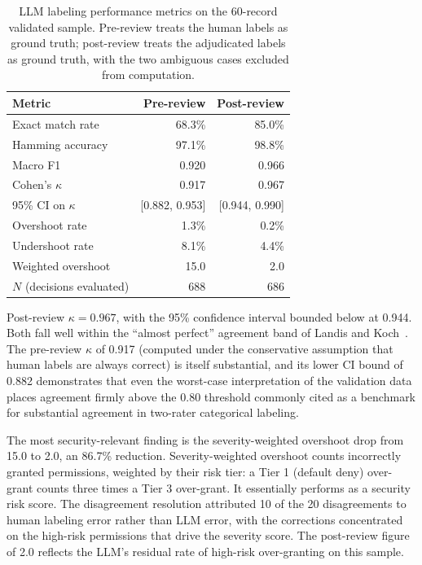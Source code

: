 \documentclass{article}
\theoremstyle{plain}
\theoremstyle{definition}
\theoremstyle{remark}
\begin{document}
\begin{table}[htbp]
\centering
\begin{tabular}{lrr}
\toprule
\textbf{Metric} & \textbf{Pre-review} & \textbf{Post-review} \\
\midrule
Exact match rate & 68.3\% & 85.0\% \\
Hamming accuracy & 97.1\% & 98.8\% \\
Macro F1 & 0.920 & 0.966 \\
Cohen's $\kappa$ & 0.917 & 0.967 \\
95\% CI on $\kappa$ & [0.882, 0.953] & [0.944, 0.990] \\
Overshoot rate & 1.3\% & 0.2\% \\
Undershoot rate & 8.1\% & 4.4\% \\
Weighted overshoot & 15.0 & 2.0 \\
$N$ (decisions evaluated) & 688 & 686 \\
\bottomrule
\end{tabular}
\caption{LLM labeling performance metrics on the 60-record validated 
sample. Pre-review treats the human labels as ground truth; 
post-review treats the adjudicated labels as ground truth, with the 
two ambiguous cases excluded from computation.}
\label{tab:pre-post-metrics}
\end{table}

Post-review $\kappa = 0.967$, with the 95\% 
confidence interval bounded below at 0.944. Both fall well within the 
``almost perfect'' agreement band of Landis and 
Koch~\citep{landis1977measurement}. The pre-review $\kappa$ of 0.917 
(computed under the conservative assumption that human labels are 
always correct) is itself substantial, and its lower CI bound of 0.882 
demonstrates that even the worst-case interpretation of the validation 
data places agreement firmly above the 0.80 threshold commonly cited 
as a benchmark for substantial agreement in two-rater categorical 
labeling.

The most security-relevant finding is the severity-weighted overshoot 
drop from 15.0 to 2.0, an 86.7\% reduction. Severity-weighted overshoot 
counts incorrectly granted permissions, weighted by their risk tier: 
a Tier 1 (default deny) over-grant counts three times a Tier 3 
over-grant. It essentially performs as a security risk score. The 
disagreement resolution attributed 10 of the 20 disagreements to human 
labeling error rather than LLM error, with the corrections concentrated 
on the high-risk permissions that drive the severity score. The 
post-review figure of 2.0 reflects the LLM's residual rate of high-risk 
over-granting on this sample.
\end{document}
